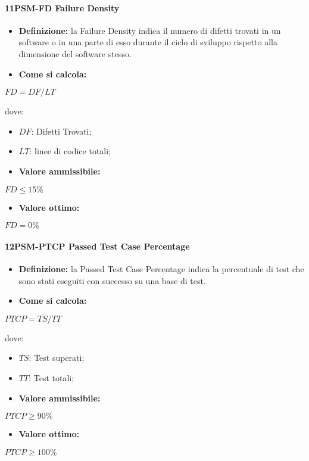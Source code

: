\paragraph*{11PSM-FD Failure Density}
\begin{itemize}
    \item \textbf{Definizione:} la Failure Density indica il numero di difetti trovati in un software o in una parte di esso durante il ciclo di sviluppo rispetto alla dimensione del software stesso.
    \item \textbf{Come si calcola:}
\end{itemize}
\begin{center}
    $FD = DF/LT$ 
 \end{center}
 dove:
 \begin{itemize}[label=$\rightarrow$]
     \item $DF$: Difetti Trovati;
     \item $LT$: linee di codice totali;
 \end{itemize}
\begin{itemize}
    \item \textbf{Valore ammissibile:}
\end{itemize}
\begin{center}
    $FD \leq 15\%$
\end{center}
\begin{itemize}
    \item \textbf{Valore ottimo:}
\end{itemize}
\begin{center}
    $FD = 0\%$
\end{center}

\paragraph*{12PSM-PTCP Passed Test Case Percentage}
\begin{itemize}
    \item \textbf{Definizione:} la Passed Test Case Percentage indica la percentuale di test che sono stati eseguiti con successo su una base di test.
    \item \textbf{Come si calcola:}
\end{itemize}
\begin{center}
    $PTCP = TS/TT$ 
 \end{center}
 dove:
 \begin{itemize}[label=$\rightarrow$]
     \item $TS$: Test superati;
     \item $TT$: Test totali;
 \end{itemize}
\begin{itemize}
    \item \textbf{Valore ammissibile:}
\end{itemize}
\begin{center}
    $PTCP \geq 90\%$
\end{center}
\begin{itemize}
    \item \textbf{Valore ottimo:}
\end{itemize}
\begin{center}
    $PTCP \geq 100\%$
\end{center}

